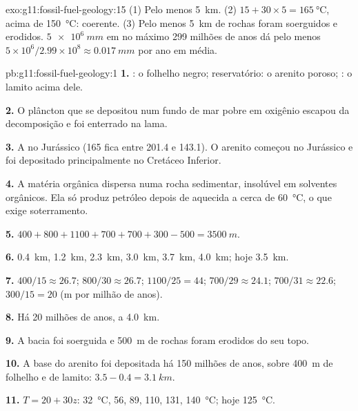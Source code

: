 \begin{solution}{exo:g11:fossil-fuel-geology:15}
(1) Pelo menos \qty{5}{km}. (2) $15 + 30 \times 5 = \qty{165}{\degreeCelsius}$,
acima de \qty{150}{\degreeCelsius}: coerente. (3) Pelo menos \qty{5}{km} de
rochas foram soerguidos e erodidos. $\qty{5e6}{mm}$ em no máximo
\num{299} milhões de anos dá pelo menos $5 \times 10^6/2.99 \times 10^8
\approx \qty{0.017}{mm}$ por ano em média.
\end{solution}

\begin{solution}{pb:g11:fossil-fuel-geology:1}
\textbf{1.} : o folhelho negro; reservatório: o arenito poroso;
: o lamito acima dele.

\textbf{2.} O plâncton que se depositou num fundo de mar pobre em oxigênio
escapou da decomposição e foi enterrado na lama.

\textbf{3.} A  no Jurássico (165 fica entre 201.4 e
143.1). O arenito começou no Jurássico e foi depositado principalmente no
Cretáceo Inferior.

\textbf{4.} A matéria orgânica dispersa numa rocha sedimentar, insolúvel em
solventes orgânicos. Ela só produz petróleo depois de aquecida a cerca de
\qty{60}{\degreeCelsius}, o que exige soterramento.

\textbf{5.} $400 + 800 + 1100 + 700 + 700 + 300 - 500 = \qty{3500}{m}$.

\textbf{6.} \qty{0.4}{km}, \qty{1.2}{km}, \qty{2.3}{km}, \qty{3.0}{km},
\qty{3.7}{km}, \qty{4.0}{km}; hoje \qty{3.5}{km}.

\textbf{7.} $400/15 \approx 26.7$; $800/30 \approx 26.7$; $1100/25 = 44$;
$700/29 \approx 24.1$; $700/31 \approx 22.6$; $300/15 = 20$ (\unit{m} por
milhão de anos).

\textbf{8.} Há 20 milhões de anos, a \qty{4.0}{km}.

\textbf{9.} A bacia foi soerguida e \qty{500}{m} de rochas foram erodidos do
seu topo.

\textbf{10.} A base do arenito foi depositada há 150 milhões de anos, sobre
\qty{400}{m} de folhelho e de lamito: $3.5 - 0.4 = \qty{3.1}{km}$.

\textbf{11.} $T = 20 + 30 z$: \qty{32}{\degreeCelsius}, \num{56}, \num{89},
\num{110}, \num{131}, \qty{140}{\degreeCelsius}; hoje
\qty{125}{\degreeCelsius}.


\end{solution}
